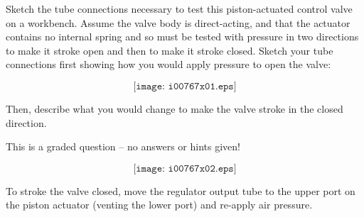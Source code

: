 

Sketch the tube connections necessary to test this piston-actuated control valve on a workbench.  Assume the valve body is direct-acting, and that the actuator contains no internal spring and so must be tested with pressure in two directions to make it stroke open and then to make it stroke closed.  Sketch your tube connections first showing how you would apply pressure to open the valve:

$$\texttt{[image: i00767x01.eps]}$$

Then, describe what you would change to make the valve stroke in the closed direction.

\vfil

\eject






This is a graded question -- no answers or hints given!







$$\texttt{[image: i00767x02.eps]}$$

To stroke the valve closed, move the regulator output tube to the upper port on the piston actuator (venting the lower port) and re-apply air pressure.




